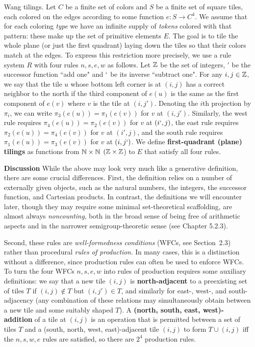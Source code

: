 \smallskip{} Wang tilings. Let $C$ be a finite set
of colors and $S$ be a finite set of square tiles, each colored on the edges
according to some function $e: S \rightarrow C^4$. We assume that for each
coloring {\it type} we have an infinite supply of {\it tokens} colored with
that pattern: these make up the set of primitive elements $E$. The goal is to
tile the whole plane (or just the first quadrant) laying down the tiles so
that their colors match at the edges. To express this restriction more
precisely, we use a rule system $R$ with four rules $n,s,e,w$ as follows.  Let
${\Bbb Z}$ be the set of integers, $'$ be the successor function ``add one"
and $`$ be its inverse ``subtract one". For any $i,j \in \Bbb Z$, we say that
the tile $u$ whose bottom left corner is at $(i,j)$ has a correct neighbor to
the north if the third component of $e(u)$ is the same as the first component
of $e(v)$ where $v$ is the tile at $(i,j')$.  Denoting the $i$th projection by
$\pi_i$, we can write $\pi_3(e(u))=\pi_1(e(v))$ for $v$ at
$(i,j')$. Similarly, the west rule requires $\pi_4(e(u))=\pi_2(e(v))$ for $v$
at $(i`,j)$, the east rule requires $\pi_2(e(u))=\pi_4(e(v))$ for $v$ at
$(i',j)$, and the south rule requires $\pi_1(e(u))=\pi_3(e(v))$ for $v$ at
$(i,j`)$. We define {\bf first-quadrant (plane) tilings} as functions from
$\Bbb N \times \Bbb N$ $(\Bbb Z \times \Bbb Z$) to $E$ that satisfy all four
rules.   

\smallskip\noindent
{\bf Discussion} While the above may look very much like a generative
definition, there are some crucial differences. First, the definition relies
on a number of externally given objects, such as the natural numbers, the
integers, the successor function, and Cartesian products. In contrast, the
definitions we will encounter later, though they may require some minimal
set-theoretical scaffolding, are almost always {\it noncounting}, both in the
broad sense of being free of arithmetic aspects and 
in the narrower semigroup-theoretic sense (see Chapter 5.2.3).

Second, these rules are {\it well-formedness conditions} (WFCs, see Section~2.3)
rather than procedural {\it rules of production.} In many cases, this is a
distinction without a difference, since production rules can often be used to
enforce WFCs. To turn the four WFCs $n,s,e,w$ into rules of production
requires some auxiliary definitions: we say that a new tile $(i,j)$ is {\bf
  north-adjacent} to a preexisting set of tiles $T$ if $(i,j) \not\in T$ but
$(i,j') \in T$, and similarly for east-, west-, and south-adjacency (any
combination of these relations may simultaneously obtain between a new tile
and some suitably shaped $T$). A {\bf (north, south, east, west)-addition} of
a tile at $(i,j)$ is an operation that is permitted between a set of tiles $T$
and a (south, north, west, east)-adjacent tile $(i,j)$ to form $T \cup (i,j)$
iff the $n,s,w,e$ rules are satisfied, so there are $2^4$ production rules.

